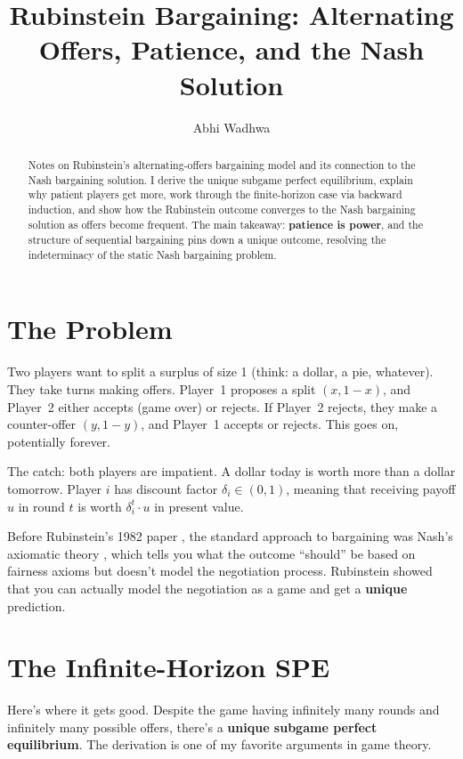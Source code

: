 \documentclass[11pt]{article}
\title{Rubinstein Bargaining: Alternating Offers, Patience, and the Nash Solution}
\author{Abhi Wadhwa}
\date{}
\begin{document}
\maketitle

\begin{abstract}
Notes on Rubinstein's alternating-offers bargaining model and its connection to the Nash bargaining solution. I derive the unique subgame perfect equilibrium, explain why patient players get more, work through the finite-horizon case via backward induction, and show how the Rubinstein outcome converges to the Nash bargaining solution as offers become frequent. The main takeaway: \textbf{patience is power}, and the structure of sequential bargaining pins down a unique outcome, resolving the indeterminacy of the static Nash bargaining problem.
\end{abstract}

\section{The Problem}

Two players want to split a surplus of size 1 (think: a dollar, a pie, whatever). They take turns making offers. Player~1 proposes a split $(x, 1-x)$, and Player~2 either accepts (game over) or rejects. If Player~2 rejects, they make a counter-offer $(y, 1-y)$, and Player~1 accepts or rejects. This goes on, potentially forever.

The catch: both players are impatient. A dollar today is worth more than a dollar tomorrow. Player $i$ has discount factor $\delta_i \in (0, 1)$, meaning that receiving payoff $u$ in round $t$ is worth $\delta_i^t \cdot u$ in present value.

Before Rubinstein's 1982 paper \cite{rubinstein1982}, the standard approach to bargaining was Nash's axiomatic theory \cite{nash1950}, which tells you what the outcome ``should'' be based on fairness axioms but doesn't model the negotiation process. Rubinstein showed that you can actually model the negotiation as a game and get a \textbf{unique} prediction.

\section{The Infinite-Horizon SPE}

Here's where it gets good. Despite the game having infinitely many rounds and infinitely many possible offers, there's a \textbf{unique subgame perfect equilibrium}. The derivation is one of my favorite arguments in game theory.
\end{document}
